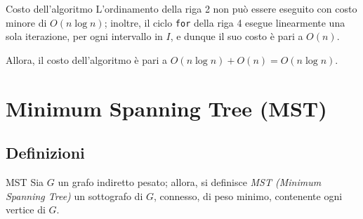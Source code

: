 \documentclass[a4paper, 12pt]{report}
\begin{document}
    \begin{framedobs}{Costo dell'algoritmo}
        L'ordinamento della riga 2 non può essere eseguito con costo minore di $O(n \log n)$; inoltre, il ciclo \texttt{for} della riga 4 esegue linearmente una sola iterazione, per ogni intervallo in $I$, e dunque il suo costo è pari a $O(n)$.

        Allora, il costo dell'algoritmo è pari a $O(n \log n) + O(n) = O(n \log n)$.
    \end{framedobs}

    \section{Minimum Spanning Tree (MST)}

    \subsection{Definizioni}

    \begin{frameddefn}{MST}
        Sia $G$ un grafo indiretto pesato; allora, si definisce \textit{MST (Minimum Spanning Tree)} un sottografo di $G$, connesso, di peso minimo, contenente ogni vertice di $G$.
    \end{frameddefn}
\end{document}

